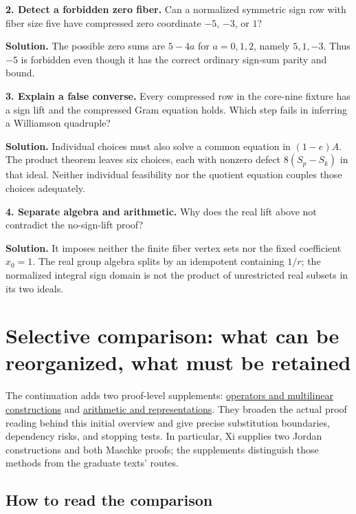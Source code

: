 \documentclass[
  11pt,
]{article}
\begin{document}
\textbf{2. Detect a forbidden zero fiber.} Can a normalized symmetric
sign row with fiber size five have compressed zero coordinate \(-5\),
\(-3\), or \(1\)?

\textbf{Solution.} The possible zero sums are \(5-4a\) for \(a=0,1,2\),
namely \(5,1,-3\). Thus \(-5\) is forbidden even though it has the
correct ordinary sign-sum parity and bound.

\textbf{3. Explain a false converse.} Every compressed row in the
core-nine fixture has a sign lift and the compressed Gram equation
holds. Which step fails in inferring a Williamson quadruple?

\textbf{Solution.} Individual choices must also solve a common equation
in \((1-e)A\). The product theorem leaves six choices, each with nonzero
defect \(8(S_p-S_k)\) in that ideal. Neither individual feasibility nor
the quotient equation couples those choices adequately.

\textbf{4. Separate algebra and arithmetic.} Why does the real lift
above not contradict the no-sign-lift proof?

\textbf{Solution.} It imposes neither the finite fiber vertex sets nor
the fixed coefficient \(x_0=1\). The real group algebra splits by an
idempotent containing \(1/r\); the normalized integral sign domain is
not the product of unrestricted real subsets in its two ideals.

\section{Selective comparison: what can be reorganized, what must be
retained}\label{selective-comparison-what-can-be-reorganized-what-must-be-retained}

The continuation adds two proof-level supplements:
\href{PROOF-COMPARISON-OPERATORS.md}{operators and multilinear
constructions} and \href{PROOF-COMPARISON-ARITHMETIC.md}{arithmetic and
representations}. They broaden the actual proof reading behind this
initial overview and give precise substitution boundaries, dependency
risks, and stopping tests. In particular, Xi supplies two Jordan
constructions and both Maschke proofs; the supplements distinguish those
methods from the graduate texts' routes.

\subsection{How to read the
comparison}\label{how-to-read-the-comparison}
\end{document}
